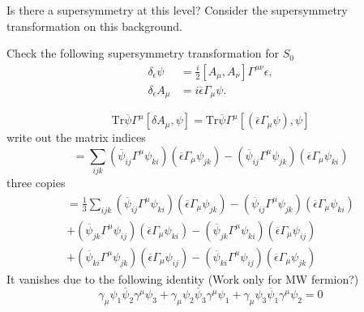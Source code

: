 \begin{question}
	Is there a supersymmetry at this level?
	Consider the supersymmetry transformation on this background.
\end{question}

Check the following supersymmetry transformation for $S_0$
\begin{align}
	\delta_{\epsilon} \psi &= \frac{i}{2} [A_\mu,A_\nu]\Gamma^{\mu\nu}\epsilon,\\
	\delta_{\epsilon}A_\mu &= i \overline{\epsilon} \Gamma_\mu \psi.
\end{align}

\begin{equation*}
	\mathrm{Tr} \overline{\psi} \Gamma^\mu [\delta A_\mu,\psi]
	= \mathrm{Tr} \overline{\psi} \Gamma^\mu [(\overline{\epsilon}
	\Gamma_\mu \psi),\psi]
\end{equation*}
write out the matrix indices
\begin{equation*}
	=\sum_{ijk} (\overline{\psi}_{ij} \Gamma^\mu \psi_{ki})
	(\overline{\epsilon}\Gamma_\mu \psi_{jk})
	-(\overline{\psi}_{ij} \Gamma^\mu \psi_{jk})
	(\overline{\epsilon}\Gamma_\mu \psi_{ki})
\end{equation*}
three copies
\begin{align*}
	=\frac{1}{3}\sum_{ijk} (\overline{\psi}_{ij} \Gamma^\mu \psi_{ki})
	(\overline{\epsilon}\Gamma_\mu \psi_{jk})
	-(\overline{\psi}_{ij} \Gamma^\mu \psi_{jk})
	(\overline{\epsilon}\Gamma_\mu \psi_{ki})
\\
+(\overline{\psi}_{jk} \Gamma^\mu \psi_{ij})
	(\overline{\epsilon}\Gamma_\mu \psi_{ki})
	-(\overline{\psi}_{jk} \Gamma^\mu \psi_{ki})
	(\overline{\epsilon}\Gamma_\mu \psi_{ij})
\\
+(\overline{\psi}_{ki} \Gamma^\mu \psi_{jk})
	(\overline{\epsilon}\Gamma_\mu \psi_{ij})
	-(\overline{\psi}_{ki} \Gamma^\mu \psi_{ij})
	(\overline{\epsilon}\Gamma_\mu \psi_{jk})
\end{align*}
It vanishes due to the following identity 
(Work only for MW fermion?)
\begin{equation}
	\gamma_\mu \psi_1 \overline{\psi}_2 \gamma^\mu \psi_3
	+\gamma_\mu \psi_2 \overline{\psi}_3 \gamma^\mu \psi_1
	+\gamma_\mu \psi_3 \overline{\psi}_1 \gamma^\mu \psi_2
	=0
\end{equation}

